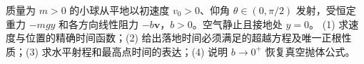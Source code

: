 质量为 \(m>0\) 的小球从平地以初速度 \(v_0>0\)、仰角 \(\theta\in(0,\pi/2)\) 发射，受恒定重力 \(-mg\hat y\) 和各方向线性阻力 \(-b\boldsymbol v\)，\(b>0\)。空气静止且接地处 \(y=0\)。
(1) 求速度与位置的精确时间函数；(2) 给出落地时间必须满足的超越方程及唯一正根性质；(3) 求水平射程和最高点时间的表达；(4) 说明 \(b\to0^+\) 恢复真空抛体公式。
